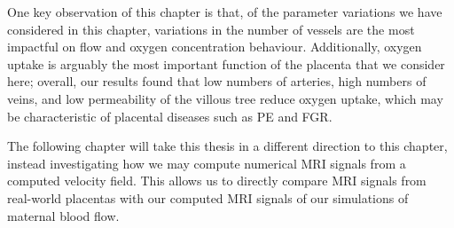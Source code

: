         One key observation of this chapter is that, of the parameter variations we have considered in this chapter, variations in the number of vessels are the most impactful on flow and oxygen concentration behaviour. Additionally, oxygen uptake is arguably the most important function of the placenta that we consider here; overall, our results found that low numbers of arteries, high numbers of veins, and low permeability of the villous tree reduce oxygen uptake, which may be characteristic of placental diseases such as PE and FGR.

        The following chapter will take this thesis in a different direction to this chapter, instead investigating how we may compute numerical MRI signals from a computed velocity field. This allows us to directly compare MRI signals from real-world placentas with our computed MRI signals of our simulations of maternal blood flow.

        




